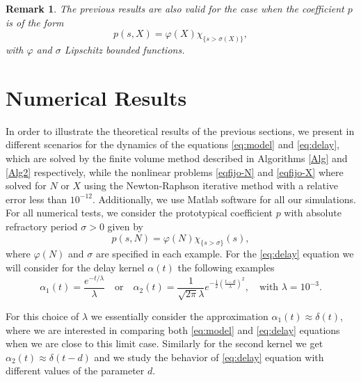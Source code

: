 \documentclass[11pt,a4paper]{article}
\newtheorem{remark}{Remark}[section]
\begin{document}
\begin{remark}
The previous results are also valid for the case when the coefficient $p$ is of the form 
\begin{equation*}
p(s,X)=\varphi(X)\chi_{\{s>\sigma(X)\}},
\end{equation*}
with $\varphi$ and $\sigma$ Lipschitz bounded functions.
\end{remark}


\section{Numerical Results}
\label{Simu}
In order to illustrate the theoretical results of the previous sections, we present in different scenarios for the dynamics of the equations  \eqref{eq:model} and \eqref{eq:delay}, which are solved by the finite volume method described in Algorithms \eqref{Alg} and \eqref{Alg2} respectively, while the nonlinear problems \eqref{eqfijo-N} and \eqref{eqfijo-X} where solved for $N$ or $X$ using the Newton-Raphson iterative method with a relative error less than $10^{-12}$. 
Additionally, we use Matlab software for all our simulations.
For all numerical tests, we consider the prototypical coefficient $p$ with absolute refractory period $\sigma>0$ given by
\begin{equation*}
p(s,N)=\varphi(N)\chi_{\{s>\sigma\}}(s),  
\end{equation*}
where $\varphi(N)$ and $\sigma$ are specified in each example. 
For the \eqref{eq:delay} equation we will consider for the delay kernel $\alpha(t)$ the following examples
\begin{equation*}
 \alpha_1(t)=\frac{e^{-t/\lambda }}{\lambda} \quad \text{or} \quad \alpha_2(t)=\frac{1}{\sqrt{2\pi}\lambda}e^{-\frac12(\frac{t-d}{\lambda})^2},\quad \text{with } \lambda=10^{-3}.     
\end{equation*}

For this choice of $\lambda$ we essentially consider the approximation $\alpha_1(t)\approx \delta(t)$, where we are interested in comparing both \eqref{eq:model} and \eqref{eq:delay} equations when we are close to this limit case. Similarly for the second kernel we get $\alpha_2(t)\approx \delta(t-d)$ and we study the behavior of \eqref{eq:delay} equation with different values of the parameter $d$.  
\end{document}
